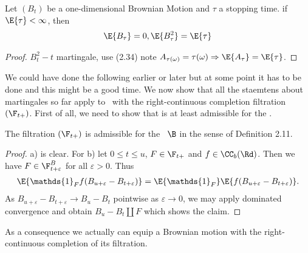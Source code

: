 \begin{cor}
Let $(B_t)$ be a one-dimensional Brownian Motion and $\tau$ a stopping time.
if $\E{\tau}<\infty$, then
\begin{align*}
\E{B_\tau}=0, \E{B_\tau^2}=\E{\tau}
\end{align*}
\end{cor}
\begin{proof}
$B_t^2-t$ martingale, use (2.34)
note $A_{\tau(\omega)}=\tau(\omega) \Rightarrow \E{A_\tau}=\E{\tau}$.
\end{proof}

We could have done the following earlier or later but at some point it has to be done and this might be a good time.
We now show that all the staemtens about martingales so far apply to \BMd\ with the right-continuous completion filtration $(\F_{t+})$.
First of all, we need to show that is at least admissible for the \BMd.
\begin{lem}
	The filtration $(\F_{t+})$ is admissible for the \BMd\ $\B$ in
	the sense of Definition 2.11.
\end{lem}
\begin{proof}
	a) is clear.
	For b) let $0\leq t \leq u$, $F \in \F_{t+}$ and $f \in
	\CC_b(\Rd)$.
	Then we have $F \in \F^B_{t+\varepsilon}$ for all
	$\varepsilon>0$.
	Thus
	\begin{align*}
		\E{\mathds{1}_F f(B_{u+\varepsilon}-B_{t+\varepsilon})}=
		\E{\mathds{1}_F} \E{f(B_{u+\varepsilon}-B_{t+\varepsilon})}.
	\end{align*}
	As $B_{u+\varepsilon}-B_{t+\varepsilon} \to B_u-B_t$ pointwise as
	$\varepsilon \to 0$, we may apply dominated convergence and
	obtain $B_u-B_t \amalg F$ which shows the claim.
\end{proof}

As a consequence we actually can equip a Brownian motion with the
right-continuous completion of its filtration.

